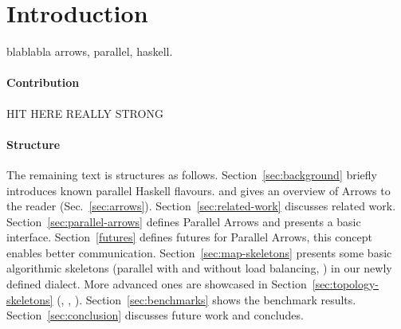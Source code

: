
\section{Introduction}
\label{sec:introduction}

blablabla arrows, parallel, haskell.

\paragraph{Contribution}

HIT HERE REALLY STRONG

\paragraph{Structure}
The remaining text is structures as follows. Section~\ref{sec:background} briefly introduces known parallel Haskell flavours. and gives an overview of Arrows to the reader (Sec.~\ref{sec:arrows}). Section~\ref{sec:related-work} discusses related work. Section~\ref{sec:parallel-arrows} defines Parallel Arrows and presents a basic interface. Section~\ref{futures} defines futures for Parallel Arrows, this concept enables better communication. Section~\ref{sec:map-skeletons} presents some basic algorithmic skeletons (parallel  with and without load balancing, ) in our newly defined dialect. More advanced ones are showcased in Section~\ref{sec:topology-skeletons} (, , ). Section~\ref{sec:benchmarks} shows the benchmark results. Section~\ref{sec:conclusion} discusses future work and concludes.


